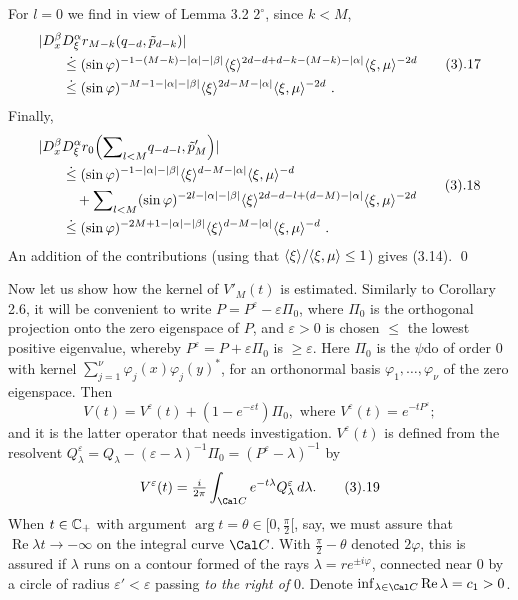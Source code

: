 For $l=0$ we find in view of Lemma 3.2 $2^\circ$, since $k<M$,
$$
\aligned
|D_x^\beta &D_\xi^\alpha r_{{M}-k}(q_{-d}, \tilde p_{d-k})|\\
 &\leg
(\sin\varphi)^{-1-{(M-k)}-|\alpha|-|\beta|}\ang\xi^{2d-d+d-k-{(M-k)}-|\alpha|}\ang{\xi
,\mu }^{-2d}\\
&\leg
(\sin\varphi)^{-{M}-1-|\alpha|-|\beta|}\ang\xi^{2d-{M}-|\alpha|}\ang{\xi ,\mu }^{-2d}
\ .
\endaligned\tag3.17
$$
Finally,
$$
\aligned
|D_x^\beta &D_\xi^\alpha  r_0\Bigl({\sum}_{l<M}q_{-d-l},
\tilde p'_{M}\Bigr)|\\
 &\leg (\sin\varphi)^{-1-|\alpha|-|\beta|}\ang\xi^{d-
M-|\alpha|}\ang{\xi ,\mu }^{-d}\\
&\quad +{\sum}_{l<M}(\sin\varphi)^{-2l
-|\alpha|-|\beta|}\ang\xi^{2d-d-l+(d-M)
-|\alpha|}\ang{\xi ,\mu }^{-2d} \\
& \leg (\sin\varphi)^{-2  M
+1-|\alpha|-|\beta|}\ang\xi^{d-
M-|\alpha|}\ang{\xi ,\mu }^{-d} \ .
\endaligned \tag3.18
$$
An addition of the contributions (using that $\langle {\xi} \rangle /\langle {\xi ,\mu
} \rangle\le 1$) gives (3.14).
\qed
\enddemo

Now let us show how the kernel of $V'_M(t)$ is estimated. Similarly to
Corollary 2.6, it will be convenient to write $P=P^\varepsilon
-\varepsilon \Pi _0$, where $\Pi _0$ is the orthogonal projection onto
the zero eigenspace of $P$, and $\varepsilon >0$ is chosen $\le $ the
lowest positive eigenvalue, whereby $P^\varepsilon =P+\varepsilon
\Pi _0$ is $\ge \varepsilon $. Here $\Pi _0$ is the $\psi $do of order 0 with kernel ${\sum}_{j=1}^\nu
\varphi _j(x)\varphi _j(y)^*$, for an orthonormal basis $\varphi
_1,\dots,\varphi _\nu $ of the zero eigenspace.
Then $$
V(t)=V^\varepsilon (t)+(1-e^{-\varepsilon t})\Pi _0,\text{ where }V^\varepsilon (t)=e^{-tP^\varepsilon };
$$
and it is the latter operator that needs investigation. $V^\varepsilon (t)$ is defined from the resolvent
$Q^\varepsilon _\lambda =Q_\lambda -(\varepsilon -\lambda )^{-1}\Pi
_0=(P^\varepsilon -\lambda )^{-1}$ by
$$
V^\varepsilon (t)=\tfrac i {2\pi }\int_{\Cal C}e^{-t\lambda }Q^\varepsilon _\lambda \,d\lambda .\tag3.19
$$
When
$t\in {\Bbb C}_+$ with argument $\arg t=\theta
\in [0,\frac\pi 2[$,  say, we must assure that
$\operatorname{Re}\lambda t\to -\infty $ on the integral curve $\Cal C$. With $\frac\pi 2-\theta $ denoted $2\varphi $, this is assured
if $\lambda $ runs on a contour formed of the rays $\lambda =re^{\pm i\varphi }$,
connected near 0 by a circle of radius $\varepsilon '<\varepsilon $
passing {\it to the
right of} 0. Denote $\inf _{\lambda \in\Cal C}\operatorname{Re}\lambda
=c_1>0$.

